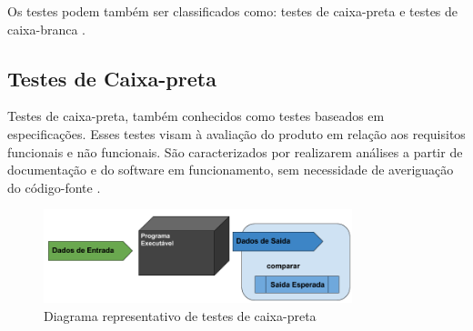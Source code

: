 \par
\indent Os testes podem também ser classificados como: testes de caixa-preta e
testes de caixa-branca \cite{barbosaEtAl2009}.

\subsection{Testes de Caixa-preta}
Testes de caixa-preta, também conhecidos como testes baseados em
especificações. Esses testes visam à avaliação do produto em relação aos
requisitos funcionais e não funcionais. São caracterizados por realizarem
análises a partir de documentação e do software em funcionamento, sem
necessidade de averiguação do código-fonte \cite{barbosaEtAl2009}.

\begin{figure}[h]
  \centering
    \includegraphics[width=0.8\textwidth]{figuras/test_black_box.png}
    \caption{Diagrama representativo de testes de caixa-preta}
    \label{test_black_box}
\end{figure}

